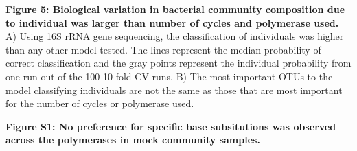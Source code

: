 \documentclass[11pt,]{article}
\begin{document}
\textbf{Figure 5: Biological variation in bacterial community
composition due to individual was larger than number of cycles and
polymerase used.} A) Using 16S rRNA gene sequencing, the classification
of individuals was higher than any other model tested. The lines
represent the median probability of correct classification and the gray
points represent the individual probability from one run out of the 100
10-fold CV runs. B) The most important OTUs to the model classifying
individuals are not the same as those that are most important for the
number of cycles or polymerase used.

\newpage

\textbf{Figure S1: No preference for specific base subsitutions was
observed across the polymerases in mock community samples.}
\end{document}

